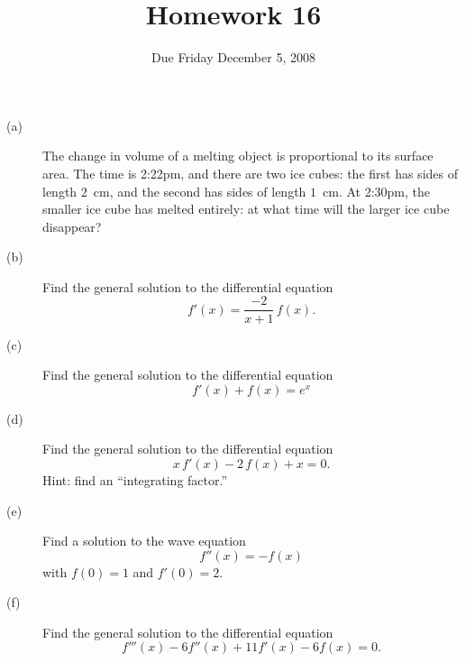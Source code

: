 \documentclass[12pt]{article}
\title{Homework 16}
\date{Due Friday December 5, 2008}
\author{}
\begin{document}
\maketitle

\begin{description}
\item[(a)] The change in volume of a melting object is proportional to
  its surface area.  The time is 2:22pm, and there are two ice cubes:
  the first has sides of length $2$~cm, and the second has sides of
  length $1$~cm.  At 2:30pm, the smaller ice cube has melted entirely:
  at what time will the larger ice cube disappear?
\vfill

\item[(b)] Find the general solution to the differential equation
$$
f'(x) = \frac{-2}{x+1} \, f(x).
$$
\vfill

\item[(c)] Find the general solution to the differential equation
$$
f'(x) + f(x) = e^x
$$
\vfill

\item[(d)] Find the general solution to the differential equation
$$
x \, f'(x) - 2 \, f(x) + x = 0.
$$
Hint: find an ``integrating factor.''
\vfill

\item[(e)] Find a solution to the wave equation
$$
f''(x) = -f(x)
$$
with $f(0) = 1$ and $f'(0) = 2$.
\vfill

\item[(f)] Find the general solution to the differential equation
$$
f'''(x) - 6 f''(x) + 11 f'(x) - 6 f(x) = 0.
$$
\vfill

\end{description}
\end{document}
